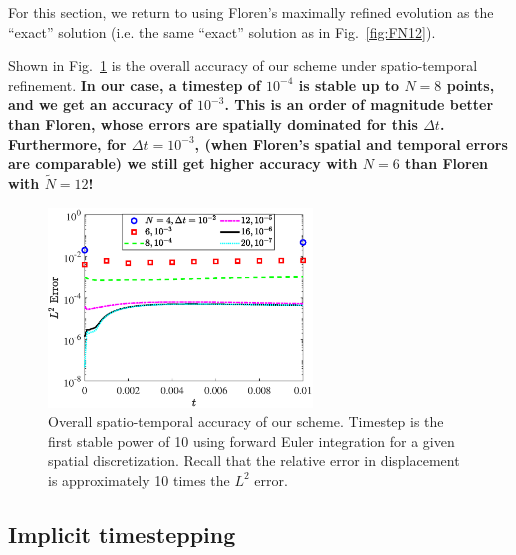 For this section, we return to using Floren's maximally refined evolution as the ``exact'' solution (i.e. the same ``exact'' solution as in Fig.\ \ref{fig:FN12}). 

Shown in Fig.\ \ref{fig:UsEx} is the overall accuracy of our scheme under spatio-temporal refinement. \textbf{In our case, a timestep of $10^{-4}$ is stable up to $N=8$ points, and we get an accuracy of $10^{-3}$. This is an order of magnitude better than Floren, whose errors are spatially dominated for this $\Delta t$. Furthermore, for $\Delta t = 10^{-3}$, (when Floren's spatial and temporal errors are comparable) we still get higher accuracy with $N=6$ than Floren with $\tilde{N}=12$!}



\begin{figure}
\centering 
\includegraphics[width=70mm]{UsTemporalSpatial.eps}
\caption{Overall spatio-temporal accuracy of our scheme. Timestep is the first stable power of 10 using forward Euler integration for a given spatial discretization. Recall that the relative error in displacement is approximately 10 times the $L^2$ error. } 
\label{fig:UsEx}
\end{figure}

\subsection{Implicit timestepping}
